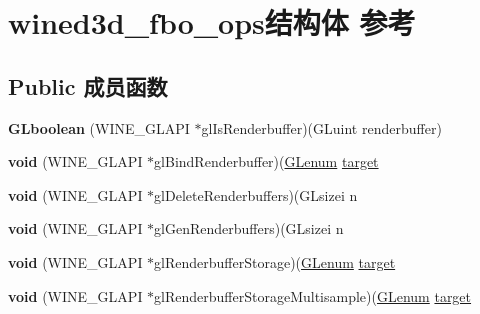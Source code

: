 \hypertarget{structwined3d__fbo__ops}{}\section{wined3d\+\_\+fbo\+\_\+ops结构体 参考}
\label{structwined3d__fbo__ops}
\subsection*{Public 成员函数}
\begin{DoxyCompactItemize}
\item 
\mbox{\label{structwined3d__fbo__ops_ae57434020912c1b938b375ce55338032}} 
{\bfseries G\+Lboolean} (W\+I\+N\+E\+\_\+\+G\+L\+A\+PI $\ast$gl\+Is\+Renderbuffer)(G\+Luint renderbuffer)
\item 
\mbox{\label{structwined3d__fbo__ops_ad3bf68badaa85cdb056d297bf69a1b0c}} 
{\bfseries void} (W\+I\+N\+E\+\_\+\+G\+L\+A\+PI $\ast$gl\+Bind\+Renderbuffer)(\hyperlink{interfacevoid}{G\+Lenum} \hyperlink{interfacevoid}{target}
\item 
\mbox{\label{structwined3d__fbo__ops_aa0a799ab13c2c9e4886a23c996c979c9}} 
{\bfseries void} (W\+I\+N\+E\+\_\+\+G\+L\+A\+PI $\ast$gl\+Delete\+Renderbuffers)(G\+Lsizei n
\item 
\mbox{\label{structwined3d__fbo__ops_aa9bc9c3e6c38d1512b16cc5aa2bd6097}} 
{\bfseries void} (W\+I\+N\+E\+\_\+\+G\+L\+A\+PI $\ast$gl\+Gen\+Renderbuffers)(G\+Lsizei n
\item 
\mbox{\label{structwined3d__fbo__ops_a9679c63fc88a6b1edc84c20f865318f1}} 
{\bfseries void} (W\+I\+N\+E\+\_\+\+G\+L\+A\+PI $\ast$gl\+Renderbuffer\+Storage)(\hyperlink{interfacevoid}{G\+Lenum} \hyperlink{interfacevoid}{target}
\item 
\mbox{\label{structwined3d__fbo__ops_ae95391bdf49f9e2a8166d204ada9fafa}} 
{\bfseries void} (W\+I\+N\+E\+\_\+\+G\+L\+A\+PI $\ast$gl\+Renderbuffer\+Storage\+Multisample)(\hyperlink{interfacevoid}{G\+Lenum} \hyperlink{interfacevoid}{target}
\item 
\mbox{\label{structwined3d__fbo__ops_ab5d9742a4477c1818f412f709fcf886e}} 

\end{DoxyCompactItemize}
